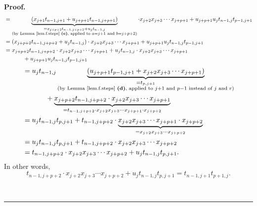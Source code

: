 \documentclass[numbers=enddot,12pt,final,onecolumn,notitlepage]{scrartcl}%
\theoremstyle{definition}
\newenvironment{proof}[1][Proof]{\noindent\textbf{#1.} }{\ \rule{0.5em}{0.5em}}
\newenvironment{vershort}{}{}
\begin{document}
\begin{proof}
\begin{vershort}
\begin{align*}
&  =\underbrace{\left(  x_{j+1}t_{n-1,j+1}+u_{j+p+1}t_{n-1,j+p+1}\right)
}_{\substack{=x_{j+p+2}t_{n-1,j+p+2}+u_{j}t_{n-1,j}\\\text{(by Lemma
\ref{lem.f.steps} \textbf{(e)}, applied to }a=j+1\text{ and }b=j+p+2\text{)}%
}}\cdot x_{j+2}x_{j+3}\cdots x_{j+p+1}+u_{j+p+1}u_{j}t_{n-1,j}t_{p-1,j+1}\\
&  =\left(  x_{j+p+2}t_{n-1,j+p+2}+u_{j}t_{n-1,j}\right)  \cdot x_{j+2}%
x_{j+3}\cdots x_{j+p+1}+u_{j+p+1}u_{j}t_{n-1,j}t_{p-1,j+1}\\
&  =x_{j+p+2}t_{n-1,j+p+2}\cdot x_{j+2}x_{j+3}\cdots x_{j+p+1}+u_{j}%
t_{n-1,j}\cdot x_{j+2}x_{j+3}\cdots x_{j+p+1}\\
&  \ \ \ \ \ \ \ \ \ \ +u_{j+p+1}u_{j}t_{n-1,j}t_{p-1,j+1}%
\end{align*}%
\begin{align*}
&  =u_{j}t_{n-1,j}\underbrace{\left(  u_{j+p+1}t_{p-1,j+1}+x_{j+2}%
x_{j+3}\cdots x_{j+p+1}\right)  }_{\substack{=t_{p,j+1}\\\text{(by Lemma
\ref{lem.f.steps} \textbf{(d)}, applied to }j+1\text{ and }p-1\text{ instead
of }j\text{ and }r\text{)}}}\\
&  \ \ \ \ \ \ \ \ \ \ +\underbrace{x_{j+p+2}t_{n-1,j+p+2}\cdot x_{j+2}%
x_{j+3}\cdots x_{j+p+1}}_{=t_{n-1,j+p+2}\cdot x_{j+2}x_{j+3}\cdots
x_{j+p+1}\cdot x_{j+p+2}}\\
&  =u_{j}t_{n-1,j}t_{p,j+1}+t_{n-1,j+p+2}\cdot\underbrace{x_{j+2}x_{j+3}\cdots
x_{j+p+1}\cdot x_{j+p+2}}_{=x_{j+2}x_{j+3}\cdots x_{j+p+2}}\\
&  =u_{j}t_{n-1,j}t_{p,j+1}+t_{n-1,j+p+2}\cdot x_{j+2}x_{j+3}\cdots
x_{j+p+2}\\
&  =t_{n-1,j+p+2}\cdot x_{j+2}x_{j+3}\cdots x_{j+p+2}+u_{j}t_{n-1,j}t_{p,j+1}.
\end{align*}
In other words,%
\[
t_{n-1,j+p+2}\cdot x_{j+2}x_{j+3}\cdots x_{j+p+2}+u_{j}t_{n-1,j}%
t_{p,j+1}=t_{n-1,j+1}t_{p+1,j}.
\]

\end{vershort}


\end{proof}
\end{document}
